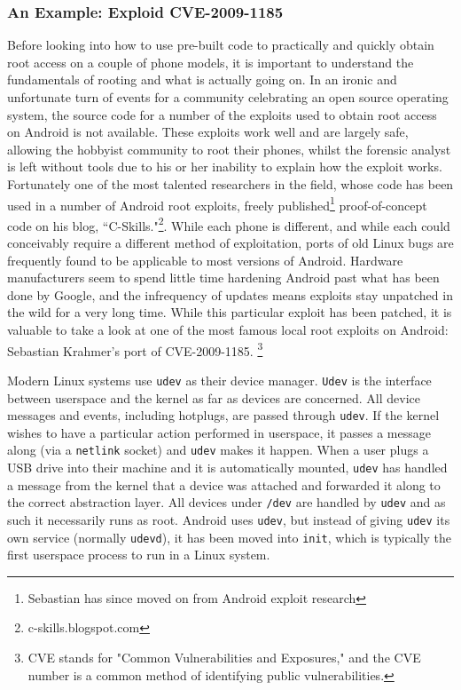 \subsubsection{An Example: Exploid CVE-2009-1185}
Before looking into how to use pre-built code to practically and quickly obtain root access on a couple of phone models, it is important to understand the fundamentals of rooting and what is actually going on. 
In an ironic and unfortunate turn of events for a community celebrating an open source operating system, the source code for a number of the exploits used to obtain root access on Android is not available. 
These exploits work well and are largely safe, allowing the hobbyist community to root their phones, whilst the forensic analyst is left without tools due to his or her inability to explain how the exploit works. 
Fortunately one of the most talented researchers in the field, whose code has been used in a number of Android root exploits, freely published\footnote{Sebastian has since moved on from Android exploit research} proof-of-concept code on his blog, ``C-Skills."\footnote{c-skills.blogspot.com}. 
While each phone is different, and while each could conceivably require a different method of exploitation, ports of old Linux bugs are frequently found to be applicable to most versions of Android. 
Hardware manufacturers seem to spend little time hardening Android past what has been done by Google, and the infrequency of updates means exploits stay unpatched in the wild for a very long time. 
While this particular exploit has been patched, it is valuable to take a look at one of the most famous local root exploits on Android: Sebastian Krahmer's port of CVE-2009-1185. \footnote{CVE stands for "Common Vulnerabilities and Exposures," and the CVE number is a common method of identifying public vulnerabilities.}
 
Modern Linux systems use \texttt{udev} as their device manager. 
\texttt{Udev} is the interface between userspace and the kernel as far as devices are concerned. 
All device messages and events, including hotplugs, are passed through \texttt{udev}. 
If the kernel wishes to have a particular action performed in userspace, it passes a message along (via a \texttt{netlink} socket) and \texttt{udev} makes it happen. 
When a user plugs a USB drive into their machine and it is automatically mounted, \texttt{udev} has handled a message from the kernel that a device was attached and forwarded it along to the correct abstraction layer. 
All devices under \texttt{/dev} are handled by \texttt{udev} and as such it necessarily runs as root. 
Android uses \texttt{udev}, but instead of giving \texttt{udev} its own service (normally \texttt{udevd}), it has been moved into \texttt{init}, which is typically the first userspace process to run in a Linux system.

